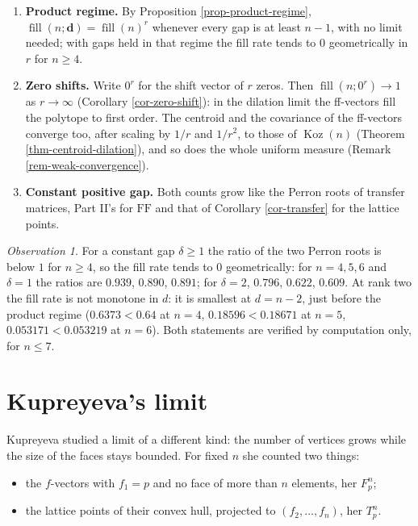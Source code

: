 \documentclass[11pt, a4paper, abstract=yes]{scrartcl}
\theoremstyle{definition}
\theoremstyle{remark}
\theoremstyle{plain}
\newcommand{\vek}[1]{\boldsymbol{#1}}
\theoremstyle{remark}
\newtheorem{observation}[definition]{Observation}
\theoremstyle{plain}
\newcommand{\Koz}{\operatorname{Koz}}
\newcommand{\FF}{\mathrm{FF}}
\begin{document}
\begin{enumerate}
\item \textbf{Product regime.} By Proposition \ref{prop-product-regime}, \(\operatorname{fill}(n;\vek d)=\operatorname{fill}(n)^r\) whenever
every gap is at least \(n-1\), with no limit needed; with gaps held in that regime the fill rate
tends to \(0\) geometrically in \(r\) for \(n\ge4\).
\item \textbf{Zero shifts.} Write \(0^r\) for the shift vector of \(r\) zeros. Then
\(\operatorname{fill}(n;0^r)\to1\) as \(r\to\infty\) (Corollary \ref{cor-zero-shift}): in the dilation
limit the ff-vectors fill the polytope to first order. The centroid and the covariance of the
ff-vectors converge too, after scaling by \(1/r\) and \(1/r^2\), to those of \(\Koz(n)\)
(Theorem \ref{thm-centroid-dilation}), and so does the whole uniform measure
(Remark \ref{rem-weak-convergence}).
\item \textbf{Constant positive gap.} Both counts grow like the Perron roots of transfer matrices, Part II's
for \(\FF\) and that of Corollary \ref{cor-transfer} for the lattice points.
\end{enumerate}

\begin{observation}
For a constant gap \(\delta\ge1\) the ratio of the two Perron roots is below \(1\) for \(n\ge4\), so
the fill rate tends to \(0\) geometrically: for \(n=4,5,6\) and \(\delta=1\) the ratios are
\(0.939\), \(0.890\), \(0.891\); for \(\delta=2\), \(0.796\), \(0.622\), \(0.609\). At rank two the
fill rate is not monotone in \(d\): it is smallest at \(d=n-2\), just before the product regime
(\(0.6373<0.64\) at \(n=4\), \(0.18596<0.18671\) at \(n=5\), \(0.053171<0.053219\) at \(n=6\)). Both
statements are verified by computation only, for \(n\le7\).
\label{obs-fill}
\end{observation}
\section{Kupreyeva's limit}
\label{sec-kupreyeva}
Kupreyeva \autocite[Section 6.2]{Kupreyeva2019} studied a limit of a different kind: the number of
vertices grows while the size of the faces stays bounded. For fixed \(n\) she counted two things:
\begin{itemize}
\item the \(f\)-vectors with \(f_1=p\) and no face of more than \(n\) elements, her \(F^n_p\);
\item the lattice points of their convex hull, projected to \((f_2,\dots,f_n)\), her \(T^n_p\).
\end{itemize}
\end{document}
